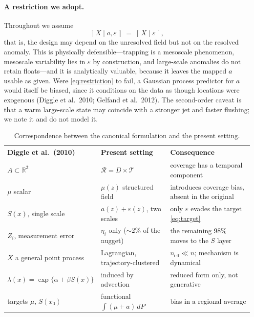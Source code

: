 \documentclass[11pt]{article}
\begin{document}
\paragraph{A restriction we adopt.} Throughout we assume
\begin{equation}
  \label{eq:restriction}
  [\,X \mid a, \varepsilon\,] \;=\; [\,X \mid \varepsilon\,],
\end{equation}
that is, the design may depend on the unresolved field but not on the resolved anomaly. This is
physically defensible---trapping is a mesoscale phenomenon, mesoscale variability lies in
$\varepsilon$ by construction, and large-scale anomalies do not retain floats---and it is
analytically valuable, because it leaves the mapped $a$ usable as given. Were
\eqref{eq:restriction} to fail, a Gaussian process predictor for $a$ would itself be biased,
since it conditions on the data as though locations were exogenous (Diggle et al.\ 2010;
Gelfand et al.\ 2012). The second-order caveat is that a warm large-scale state may coincide
with a stronger jet and faster flushing; we note it and do not model it.

\begin{table}[h]
\centering
\begin{tabular}{p{}p{}p{}}
\toprule
Diggle et al.\ (2010) & Present setting & Consequence \\
\midrule
$A \subset \mathbb{R}^2$ &
$\mathcal{R} = D \times \mathcal{T}$ &
coverage has a temporal component \\
$\mu$ scalar &
$\mu(z)$ structured field &
introduces coverage bias, absent in the original \\
$S(x)$, single scale &
$a(z) + \varepsilon(z)$, two scales &
only $\varepsilon$ evades the target \eqref{eq:target} \\
$Z_i$, measurement error &
$\eta_i$ only ($\sim2\%$ of the nugget) &
the remaining $98\%$ moves to the $S$ layer \\
$X$ a general point process &
Lagrangian, trajectory-clustered &
$n_{\text{eff}} \ll n$; mechanism is dynamical \\
$\lambda(x) = \exp\{\alpha + \beta S(x)\}$ &
induced by advection &
reduced form only, not generative \\
targets $\mu$, $S(x_0)$ &
functional $\int (\mu + a)\,dP$ &
bias in a regional average \\
\bottomrule
\end{tabular}
\caption{Correspondence between the canonical formulation and the present setting.}
\label{tab:correspondence}
\end{table}
\end{document}

